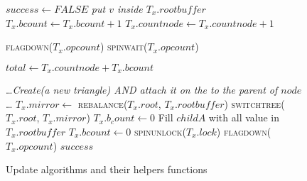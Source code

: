 \begin{figure}[!t]
\centering
\begin{algorithmic} [1]                   
\small
			$success \gets FALSE$   
		\Else
\State \textit{put $v$ inside $T_x.rootbuffer$} \label{lst:line:insertbuffer}
			\State $T_x.bcount\gets T_x.bcount + 1$
        			\State $T_x.countnode\gets T_x.countnode + 1$
\EndIf            
          	                                            			

                
                
                		\State \textsc{flagdown}($T_x.opcount$)                                      
                		\State \textsc{spinwait}($T_x.opcount$)                                           
                
                		\State $total \gets T_x.countnode + T_x.bcount$
                		
                		                             
                    		\State \ldots \textit{Create(a new triangle) AND attach it on the to the parent of $node$} \ldots                   
                		\Else
                        			\State $T_x.mirror \gets$ \textsc{rebalance}($T_x.root$, $T_x.rootbuffer$)
                        			\State \textsc{switchtree}($T_x.root$, $T_x.mirror$)
                        			\State $T_x.b_count \gets 0$
                    		\Else
                            			\State Fill $childA$ with all value in $T_x.rootbuffer$ 	
                            			\State $T_x.bcount \gets 0$
                        			\EndIf                             
				\EndIf
                		\EndIf	
			\State \textsc{spinunlock}($T_x.lock$)   
		\Else
			\State \textsc{flagdown}($T_x.opcount$) 
		\EndIf    
	\EndIf                                  
\EndIf
\State \Return $success$
\EndFunction
\end{algorithmic}
\caption{Update algorithms and their helpers functions}\label{lst:pseudo-ops}
\end{figure}

